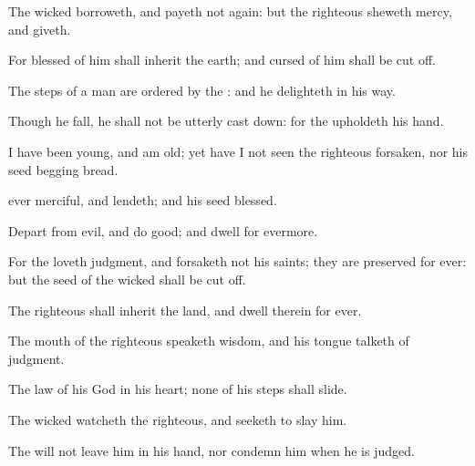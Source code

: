 {\Q {}The
wicked
borroweth, and payeth not
again: but the
righteous sheweth
mercy, and
giveth.


\par }{\Q {}For
{}
blessed of him shall
inherit the
earth; and
{}
cursed of him shall be cut
off.


\par }{\Q {}The
steps of a
{}
man are
ordered by the
{}: and he
delighteth in his
way.


\par }{\Q {}Though he
fall, he shall not be utterly cast
down: for the
{}
upholdeth
{} his
hand.


\par }{\Q {}I have been
young, and
{} am
old; yet have I not
seen the
righteous
forsaken, nor his
seed
begging
bread.


\par }{\Q {}
ever
merciful, and
lendeth; and his
seed
{}
blessed.


\par }{\Q {}Depart from
evil, and
do
good; and
dwell for
evermore.


\par }{\Q {}For the
{}
loveth
judgment, and
forsaketh not his
saints; they are
preserved for
ever: but the
seed of the
wicked shall be cut
off.


\par }{\Q {}The
righteous shall
inherit the
land, and
dwell therein for
ever.


\par }{\Q {}The
mouth of the
righteous
speaketh
wisdom, and his
tongue
talketh of
judgment.


\par }{\Q {}The
law of his
God
{} in his
heart; none of his
steps shall
slide.


\par }{\Q {}The
wicked
watcheth the
righteous, and
seeketh to
slay him.


\par }{\Q {}The
{} will not
leave him in his
hand, nor
condemn him when he is
judged.


\par }{\BB \par }
